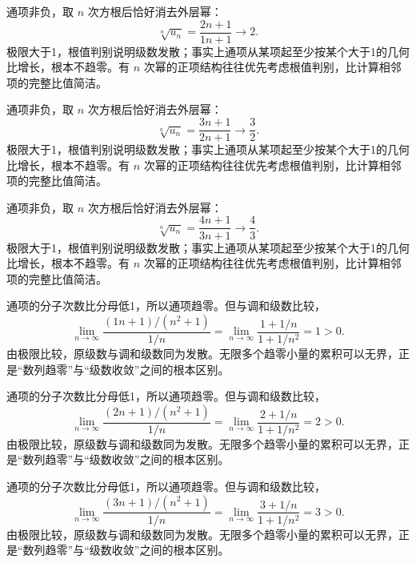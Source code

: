 \documentclass[UTF8,12pt,a4paper,fontset=fandol]{ctexart}
\begin{document}
\begin{solve}\label{ans:c25q10}
通项非负，取 $n$ 次方根后恰好消去外层幂：
\[
\sqrt[n]{u_n}=\frac{2n+1}{1n+1}\longrightarrow 2.
\]
极限大于1，根值判别说明级数发散；事实上通项从某项起至少按某个大于1的几何比增长，根本不趋零。有 $n$ 次幂的正项结构往往优先考虑根值判别，比计算相邻项的完整比值简洁。
\end{solve}

\begin{solve}\label{ans:c25q11}
通项非负，取 $n$ 次方根后恰好消去外层幂：
\[
\sqrt[n]{u_n}=\frac{3n+1}{2n+1}\longrightarrow \frac{3}{2}.
\]
极限大于1，根值判别说明级数发散；事实上通项从某项起至少按某个大于1的几何比增长，根本不趋零。有 $n$ 次幂的正项结构往往优先考虑根值判别，比计算相邻项的完整比值简洁。
\end{solve}

\begin{solve}\label{ans:c25q12}
通项非负，取 $n$ 次方根后恰好消去外层幂：
\[
\sqrt[n]{u_n}=\frac{4n+1}{3n+1}\longrightarrow \frac{4}{3}.
\]
极限大于1，根值判别说明级数发散；事实上通项从某项起至少按某个大于1的几何比增长，根本不趋零。有 $n$ 次幂的正项结构往往优先考虑根值判别，比计算相邻项的完整比值简洁。
\end{solve}

\begin{solve}\label{ans:c25q13}
通项的分子次数比分母低1，所以通项趋零。但与调和级数比较，
\[
\lim_{n\to\infty}\frac{(1n+1)/(n^2+1)}{1/n}=\lim_{n\to\infty}\frac{1+1/n}{1+1/n^2}=1>0.
\]
由极限比较，原级数与调和级数同为发散。无限多个趋零小量的累积可以无界，正是“数列趋零”与“级数收敛”之间的根本区别。
\end{solve}

\begin{solve}\label{ans:c25q14}
通项的分子次数比分母低1，所以通项趋零。但与调和级数比较，
\[
\lim_{n\to\infty}\frac{(2n+1)/(n^2+1)}{1/n}=\lim_{n\to\infty}\frac{2+1/n}{1+1/n^2}=2>0.
\]
由极限比较，原级数与调和级数同为发散。无限多个趋零小量的累积可以无界，正是“数列趋零”与“级数收敛”之间的根本区别。
\end{solve}

\begin{solve}\label{ans:c25q15}
通项的分子次数比分母低1，所以通项趋零。但与调和级数比较，
\[
\lim_{n\to\infty}\frac{(3n+1)/(n^2+1)}{1/n}=\lim_{n\to\infty}\frac{3+1/n}{1+1/n^2}=3>0.
\]
由极限比较，原级数与调和级数同为发散。无限多个趋零小量的累积可以无界，正是“数列趋零”与“级数收敛”之间的根本区别。
\end{solve}
\end{document}
